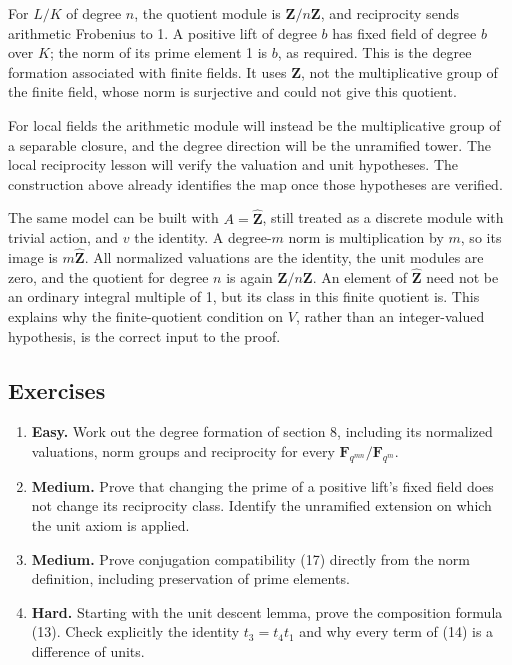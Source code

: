 \documentclass[11pt,a4paper]{article}
\newcommand{\tightlist}{\setlength{\itemsep}{0pt}\setlength{\parskip}{0pt}}
\begin{document}
For \(L/K\) of degree \(n\), the quotient module is
\(\mathbf Z/n\mathbf Z\), and reciprocity sends arithmetic Frobenius to
1. A positive lift of degree \(b\) has fixed field of degree \(b\) over
\(K\); the norm of its prime element 1 is \(b\), as required. This is
the degree formation associated with finite fields. It uses
\(\mathbf Z\), not the multiplicative group of the finite field, whose
norm is surjective and could not give this quotient.

For local fields the arithmetic module will instead be the
multiplicative group of a separable closure, and the degree direction
will be the unramified tower. The local reciprocity lesson will verify
the valuation and unit hypotheses. The construction above already
identifies the map once those hypotheses are verified.

The same model can be built with \(A=\widehat{\mathbf Z}\), still
treated as a discrete module with trivial action, and \(v\) the
identity. A degree-\(m\) norm is multiplication by \(m\), so its image
is \(m\widehat{\mathbf Z}\). All normalized valuations are the identity,
the unit modules are zero, and the quotient for degree \(n\) is again
\(\mathbf Z/n\mathbf Z\). An element of \(\widehat{\mathbf Z}\) need not
be an ordinary integral multiple of 1, but its class in this finite
quotient is. This explains why the finite-quotient condition on \(V\),
rather than an integer-valued hypothesis, is the correct input to the
proof.

\subsection{Exercises}\label{exercises}

\begin{enumerate}
\def\labelenumi{\arabic{enumi}.}
\tightlist
\item
  \textbf{Easy.} Work out the degree formation of section 8, including
  its normalized valuations, norm groups and reciprocity for every
  \(\mathbf F_{q^{mn}}/\mathbf F_{q^m}\).
\item
  \textbf{Medium.} Prove that changing the prime of a positive lift's
  fixed field does not change its reciprocity class. Identify the
  unramified extension on which the unit axiom is applied.
\item
  \textbf{Medium.} Prove conjugation compatibility (17) directly from
  the norm definition, including preservation of prime elements.
\item
  \textbf{Hard.} Starting with the unit descent lemma, prove the
  composition formula (13). Check explicitly the identity \(t_3=t_4t_1\)
  and why every term of (14) is a difference of units.
\end{enumerate}
\end{document}
